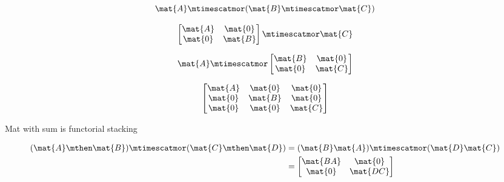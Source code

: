 \begin{forslides}
    \begin{equation}
        \label{eq:parallelism-052}
        \mat{A} \mtimescatmor ( \mat{B} \mtimescatmor \mat{C} )
    \end{equation}

    \begin{equation}
        \label{eq:parallelism-053}
        \begin{bmatrix}
            \mat{A} & \mat{0} \\
            \mat{0} & \mat{B}
        \end{bmatrix}
        \mtimescatmor \mat{C}
    \end{equation}

    \begin{equation}
        \label{eq:parallelism-054}
        \mat{A} \mtimescatmor
        \begin{bmatrix}
            \mat{B} & \mat{0} \\
            \mat{0} & \mat{C}
        \end{bmatrix}
    \end{equation}

    \begin{equation}
        \label{eq:parallelism-055}
        \begin{bmatrix}
            \mat{A} & \mat{0} & \mat{0} \\
            \mat{0} & \mat{B} & \mat{0} \\
            \mat{0} & \mat{0} & \mat{C}
        \end{bmatrix}
    \end{equation}

    Mat with sum is functorial stacking

    \begin{align}\label{eq:parallelism-056}
        (\mat{A} \mthen \mat{B}) \mtimescatmor (\mat{C} \mthen \mat{D}) & = (\mat{B}\mat{A}) \mtimescatmor (\mat{D}\mat{C}) \\
                                                                        & =
        \begin{bmatrix}
            \mat{BA} & \mat{0}  \\
            \mat{0}  & \mat{DC}
        \end{bmatrix}
    \end{align}


\end{forslides}
